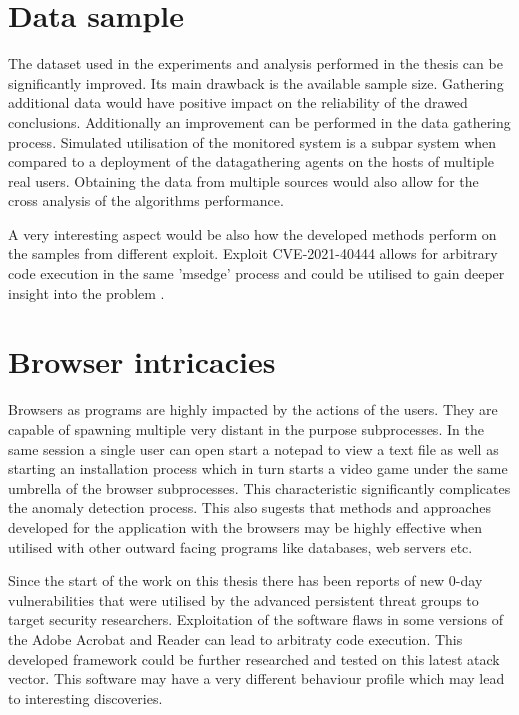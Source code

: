 \documentclass[a4paper,twoside,12pt]{book}
\begin{document}
\section{Data sample}

The dataset used in the experiments and analysis performed in the thesis can be significantly 
improved. Its main drawback is the available sample size. Gathering additional data would have
positive impact on the reliability of the drawed conclusions. Additionally an improvement 
can be performed in the data gathering process. Simulated utilisation of the monitored system
is a subpar system when compared to a deployment of the datagathering agents on the hosts of 
multiple real users. Obtaining the data from multiple sources would also allow for the cross
analysis of the algorithms performance. 

A very interesting aspect would be also how the developed methods perform on the samples from 
different exploit. Exploit CVE-2021-40444 allows for arbitrary code execution in the same 'msedge'
process and could be utilised to gain deeper insight into the problem \cite{bib:newEdgeExploit}.

\section{Browser intricacies}

Browsers as programs are highly impacted by the actions of the users. They are capable of spawning
multiple very distant in the purpose subprocesses. In the same session a single user can open start
a notepad to view a text file as well as starting an installation process which in turn starts a 
video game under the same umbrella of the browser subprocesses. This characteristic significantly
complicates the anomaly detection process. This also sugests that methods and approaches developed
for the application with the browsers may be highly effective when utilised with other outward 
facing programs like databases, web servers etc.

Since the start of the work on this thesis there has been reports of new 0-day vulnerabilities that were
utilised by the advanced persistent threat groups to target security researchers. Exploitation of the
software flaws in some versions of the Adobe Acrobat and Reader can lead to arbitraty code execution\cite{bib:AdobeExploit}.
This developed framework could be further researched and tested on this latest atack vector. This 
software may have a very different behaviour profile which may lead to interesting discoveries.
\end{document}
